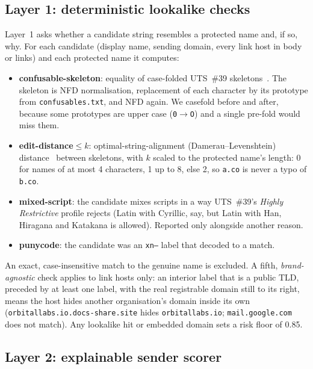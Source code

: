 \documentclass[10pt,twocolumn]{article}
\newcommand{\code}[1]{\texttt{#1}}
\begin{document}
\subsection{Layer 1: deterministic lookalike checks}
\label{sec:l1}

Layer~1 asks whether a candidate string resembles a protected name and, if so, why. For each candidate (display name, sending domain, every link host in body or links) and each protected name it computes:
\begin{itemize}
\item \textbf{confusable-skeleton}: equality of case-folded UTS~\#39 skeletons~\cite{uts39}. The skeleton is NFD normalisation, replacement of each character by its prototype from \code{confusables.txt}, and NFD again. We casefold before and after, because some prototypes are upper case (\code{0}$\to$\code{O}) and a single pre-fold would miss them.
\item \textbf{edit-distance$\leq k$}: optimal-string-alignment (Damerau--Levenshtein) distance~\cite{damerau1964technique,levenshtein1966binary} between skeletons, with $k$ scaled to the protected name's length: 0 for names of at most 4 characters, 1 up to 8, else 2, so \code{a.co} is never a typo of \code{b.co}.
\item \textbf{mixed-script}: the candidate mixes scripts in a way UTS~\#39's \emph{Highly Restrictive} profile rejects (Latin with Cyrillic, say, but Latin with Han, Hiragana and Katakana is allowed). Reported only alongside another reason.
\item \textbf{punycode}: the candidate was an \code{xn--} label that decoded to a match.
\end{itemize}
An exact, case-insensitive match to the genuine name is excluded. A fifth, \emph{brand-agnostic} check applies to link hosts only: an interior label that is a public TLD, preceded by at least one label, with the real registrable domain still to its right, means the host hides another organisation's domain inside its own (\code{orbitallabs.io.docs-share.site} hides \code{orbitallabs.io}; \code{mail.google.com} does not match). Any lookalike hit or embedded domain sets a risk floor of 0.85.

\subsection{Layer 2: explainable sender scorer}
\label{sec:l2}
\end{document}
